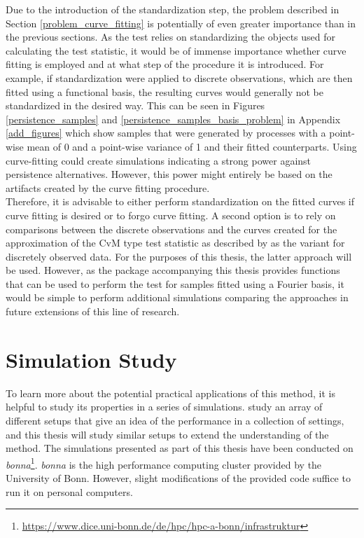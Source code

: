 \documentclass[12pt, a4paper]{article}
\theoremstyle{MAstyle} \newtheorem{assumption}{Assumption}[section]
\theoremstyle{MAstyle} \newtheorem{definition}{Definition}[section]
\theoremstyle{MAstyle} \newtheorem{theorem}{Theorem}[section]
\begin{document}
		Due to the introduction of the standardization step, the problem described in Section \ref{problem_curve_fitting} is potentially of even greater importance than in the previous sections. As the test relies on standardizing the objects used for calculating the test statistic, it would be of immense importance whether curve fitting is employed and at what step of the procedure it is introduced. For example, if standardization were applied to discrete observations, which are then fitted using a functional basis, the resulting curves would generally not be standardized in the desired way. This can be seen in Figures \ref{persistence_samples} and \ref{persistence_samples_basis_problem} in Appendix \ref{add_figures} which show samples that were generated by processes with a point-wise mean of 0 and a point-wise variance of 1 and their fitted counterparts. 
		Using curve-fitting could create simulations indicating a strong power against persistence alternatives. However, this power might entirely be based on the artifacts created by the curve fitting procedure.\\
		
		Therefore, it is advisable to either perform standardization on the fitted curves if curve fitting is desired or to forgo curve fitting. A second option is to rely on comparisons between the discrete observations and the curves created for the approximation of the CvM type test statistic as described by \cite{bugni_permutation_2021} as the variant for discretely observed data. For the purposes of this thesis, the latter approach will be used. However, as the package accompanying this thesis provides functions that can be used to perform the test for samples fitted using a Fourier basis, it would be simple to perform additional simulations comparing the approaches in future extensions of this line of research.
		
	\section{Simulation Study}\label{Simulation_Study}
		To learn more about the potential practical applications of this method, it is helpful to study its properties in a series of simulations. \cite{bugni_permutation_2021} study an array of different setups that give an idea of the performance in a collection of settings, and this thesis will study similar setups to extend the understanding of the method.		
		The simulations presented as part of this thesis have been conducted on \textit{bonna}\footnote{\href{https://www.dice.uni-bonn.de/de/hpc/hpc-a-bonn/infrastruktur}{https://www.dice.uni-bonn.de/de/hpc/hpc-a-bonn/infrastruktur}}. \textit{bonna} is the high performance computing cluster provided by the University of Bonn. However, slight modifications of the provided code suffice to run it on personal computers.\\
\end{document}
